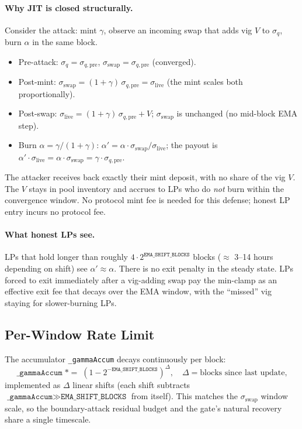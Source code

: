 \documentclass[11pt]{article}
\begin{document}
\paragraph{Why JIT is closed structurally.}
Consider the attack: mint $\gamma$, observe an incoming swap that
adds vig $V$ to $\sigma_q$, burn $\alpha$ in the same block.
\begin{itemize}
  \item Pre-attack: $\sigma_q = \sigma_{q,\mathrm{pre}}$,
        $\sigma_{\mathrm{swap}} = \sigma_{q,\mathrm{pre}}$ (converged).
  \item Post-mint: $\sigma_{\mathrm{swap}} = (1 + \gamma)\,
        \sigma_{q,\mathrm{pre}} = \sigma_{\mathrm{live}}$ (the mint
        scales both proportionally).
  \item Post-swap: $\sigma_{\mathrm{live}} = (1 + \gamma)\,
        \sigma_{q,\mathrm{pre}} + V$;
        $\sigma_{\mathrm{swap}}$ is unchanged (no mid-block EMA step).
  \item Burn $\alpha = \gamma / (1 + \gamma)$:
        $\alpha' = \alpha \cdot \sigma_{\mathrm{swap}} /
        \sigma_{\mathrm{live}}$;
        the payout is
        $\alpha' \cdot \sigma_{\mathrm{live}} = \alpha \cdot
        \sigma_{\mathrm{swap}} = \gamma \cdot \sigma_{q,\mathrm{pre}}$.
\end{itemize}
The attacker receives back exactly their mint deposit, with no share
of the vig $V$. The $V$ stays in pool inventory and accrues to LPs who
do \emph{not} burn within the convergence window. No protocol mint fee
is needed for this defense; honest LP entry incurs no protocol fee.

\paragraph{What honest LPs see.}
LPs that hold longer than roughly $4 \cdot 2^{\texttt{EMA\_SHIFT\_BLOCKS}}$
blocks ($\approx$ 3--14 hours depending on shift) see $\alpha' \approx
\alpha$. There is no exit penalty in the steady state. LPs forced to
exit immediately after a vig-adding swap pay the min-clamp as an
effective exit fee that decays over the EMA window, with the
``missed'' vig staying for slower-burning LPs.

\subsection{Per-Window Rate Limit}
\label{sec:rate-limit}

The accumulator \texttt{\_gammaAccum} decays continuously per block:
\[
  \texttt{\_gammaAccum}
  \;\mathrel{\mathord{*}{=}}\;
  \left(1 - 2^{-\texttt{EMA\_SHIFT\_BLOCKS}}\right)^{\!\Delta},
  \quad \Delta = \text{blocks since last update,}
\]
implemented as $\Delta$ linear shifts (each shift subtracts
$\texttt{\_gammaAccum} \gg \texttt{EMA\_SHIFT\_BLOCKS}$ from itself).
This matches the $\sigma_{\mathrm{swap}}$ window scale, so the
boundary-attack residual budget and the gate's natural recovery
share a single timescale.
\end{document}

